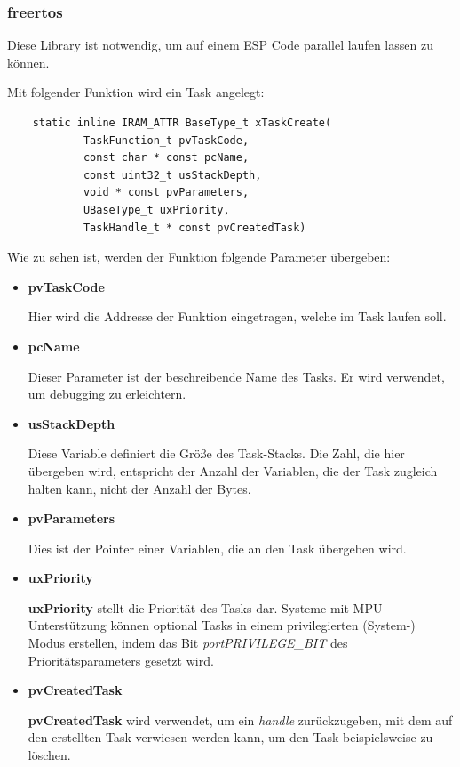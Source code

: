 \subsubsection{freertos}\label{sec:esp-idf-libraries-freertos}
Diese Library ist notwendig, um auf einem ESP Code parallel laufen lassen zu können.

Mit folgender Funktion wird ein Task angelegt:
\begin{verbatim}
    static inline IRAM_ATTR BaseType_t xTaskCreate(
            TaskFunction_t pvTaskCode,
            const char * const pcName,
            const uint32_t usStackDepth,
            void * const pvParameters,
            UBaseType_t uxPriority,
            TaskHandle_t * const pvCreatedTask)
\end{verbatim}

Wie zu sehen ist, werden der Funktion folgende Parameter übergeben:
\begin{itemize}
    \item \textbf{pvTaskCode}

    Hier wird die Addresse der Funktion eingetragen, welche im Task laufen soll. 
    
    \item \textbf{pcName}
    
    Dieser Parameter ist der beschreibende Name des Tasks. Er wird verwendet, um debugging zu erleichtern.

    \item \textbf{usStackDepth}
    
    Diese Variable definiert die Größe des Task-Stacks. Die Zahl, die hier übergeben wird, entspricht der Anzahl der Variablen, die der Task zugleich halten kann, nicht der Anzahl der Bytes.
    \item \textbf{pvParameters}
    
    Dies ist der Pointer einer Variablen, die an den Task übergeben wird.
    \item  \textbf{uxPriority}
    
    \textbf{uxPriority} stellt die Priorität des Tasks dar. Systeme mit MPU-Unterstützung können optional Tasks in einem privilegierten (System-) Modus erstellen, indem das Bit \textit{portPRIVILEGE\_BIT} des Prioritätsparameters gesetzt wird.
    \item \textbf{pvCreatedTask}
    
    \textbf{pvCreatedTask} wird verwendet, um ein \textit{handle} zurückzugeben, mit dem auf den erstellten Task verwiesen werden kann, um den Task beispielsweise zu löschen.
\end{itemize}
\cite{xTaskCreate_definition}

